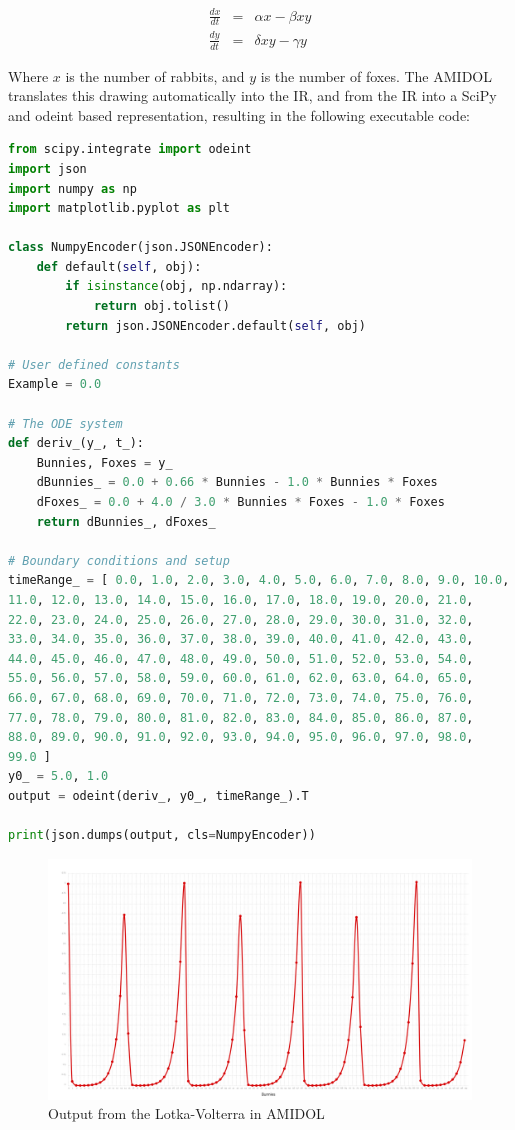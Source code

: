\documentclass[11pt]{article}
\newcommand{\amidol}{\textsc{AMIDOL}}
\begin{document}
\begin{eqnarray}
  \frac{dx}{dt} &=& \alpha x - \beta x y\\
  \frac{dy}{dt} &=& \delta x y - \gamma y
\end{eqnarray}

Where $x$ is the number of rabbits, and $y$ is the number of foxes.  The \amidol{} translates this drawing automatically into the IR, and from the IR into a SciPy and odeint based representation, resulting in the following executable code:

\begin{lstlisting}[language=python]
  from scipy.integrate import odeint
import json
import numpy as np
import matplotlib.pyplot as plt

class NumpyEncoder(json.JSONEncoder):
    def default(self, obj):
        if isinstance(obj, np.ndarray):
            return obj.tolist()
        return json.JSONEncoder.default(self, obj)

# User defined constants
Example = 0.0

# The ODE system
def deriv_(y_, t_):
    Bunnies, Foxes = y_
    dBunnies_ = 0.0 + 0.66 * Bunnies - 1.0 * Bunnies * Foxes
    dFoxes_ = 0.0 + 4.0 / 3.0 * Bunnies * Foxes - 1.0 * Foxes
    return dBunnies_, dFoxes_

# Boundary conditions and setup
timeRange_ = [ 0.0, 1.0, 2.0, 3.0, 4.0, 5.0, 6.0, 7.0, 8.0, 9.0, 10.0,
11.0, 12.0, 13.0, 14.0, 15.0, 16.0, 17.0, 18.0, 19.0, 20.0, 21.0,
22.0, 23.0, 24.0, 25.0, 26.0, 27.0, 28.0, 29.0, 30.0, 31.0, 32.0,
33.0, 34.0, 35.0, 36.0, 37.0, 38.0, 39.0, 40.0, 41.0, 42.0, 43.0,
44.0, 45.0, 46.0, 47.0, 48.0, 49.0, 50.0, 51.0, 52.0, 53.0, 54.0,
55.0, 56.0, 57.0, 58.0, 59.0, 60.0, 61.0, 62.0, 63.0, 64.0, 65.0,
66.0, 67.0, 68.0, 69.0, 70.0, 71.0, 72.0, 73.0, 74.0, 75.0, 76.0,
77.0, 78.0, 79.0, 80.0, 81.0, 82.0, 83.0, 84.0, 85.0, 86.0, 87.0,
88.0, 89.0, 90.0, 91.0, 92.0, 93.0, 94.0, 95.0, 96.0, 97.0, 98.0,
99.0 ]
y0_ = 5.0, 1.0
output = odeint(deriv_, y0_, timeRange_).T

print(json.dumps(output, cls=NumpyEncoder))
\end{lstlisting}

\begin{figure}
  \includegraphics[width=\textwidth]{figs/bunnies.png}
\caption{Output from the Lotka-Volterra in \amidol{}}
\label{Fig:LKOut}
\end{figure}
\end{document}
